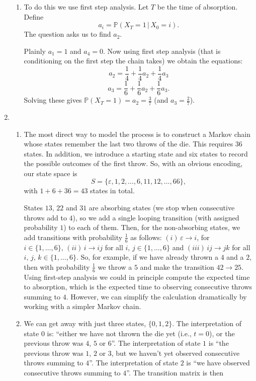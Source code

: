 \documentclass[11pt,a4paper]{report}
\begin{document}
\begin{enumerate}
\begin{enumerate}
            \item To do this we use first step analysis. Let $T$ be the time of absorption. Define $$a_i=\mathbb{P}(X_T=1\,|\,X_0=i).$$The question asks us to find $a_2$.\par
            Plainly $a_1=1$ and $a_4 = 0$. Now using first step analysis (that is conditioning on the first step the chain takes) we obtain the equations: $$a_2=\frac{1}{4}+\frac{1}{4}a_2+\frac{1}{4}a_3$$ $$a_3=\frac{1}{6}+\frac{1}{6}a_2+\frac{1}{6}a_3.$$ Solving these gives $\mathbb{P}(X_T=1)=a_2=\frac{3}{7}$ (and $a_3=\frac{2}{7}$).
        \end{enumerate}
        \item
        \begin{enumerate}
            \item The most direct way to model the process is to construct a Markov chain whose states remember the last two throws of the die. This requires $36$ states. In addition, we introduce a starting state and six states to record the possible outcomes of the first throw. So, with an obvious encoding, our state space is $$S=\{\varepsilon,1,2,\ldots,6,11,12,\ldots,66\},$$ with $1+6+36=43$ states in total.\par
            States $13,\, 22$ and $31$ are absorbing states (we stop when consecutive throws add to $4$), so we add a single looping transition (with assigned probability $1$) to each of them. Then, for the non-absorbing states, we add transitions with probability $\frac{1}{6}$ as follows: $(i)\, \varepsilon \to i$, for $i\in \{1,\ldots,6\},\, (ii)\, i\to ij$ for all $i,\,j\in \{1,\ldots,6\}$ and $(iii)\, ij\to jk$ for all $i,\, j,\, k \in \{1,\ldots,6\}$. So, for example, if we have already thrown a $4$ and a $2$, then with probability $\frac{1}{6}$ we throw a $5$ and make the transition $42\to 25$. Using first-step analysis we could in principle compute the expected time to absorption, which is the expected time to observing consecutive throws summing to $4$. However, we can simplify the calculation dramatically by working with a simpler Markov chain.
            \item We can get away with just three states, $\{0, 1, 2\}$. The interpretation of state $0$ is: “either we have not thrown the die yet (i.e., $t = 0$), or the previous throw was $4$, $5$ or $6$”. The interpretation of state $1$ is “the previous throw was $1$, $2$ or $3$, but we haven’t yet observed consecutive throws summing to $4$”. The interpretation of state $2$ is “we have observed consecutive throws summing to $4$”. The transition matrix is then 

\end{enumerate}
\end{enumerate}
\end{document}
